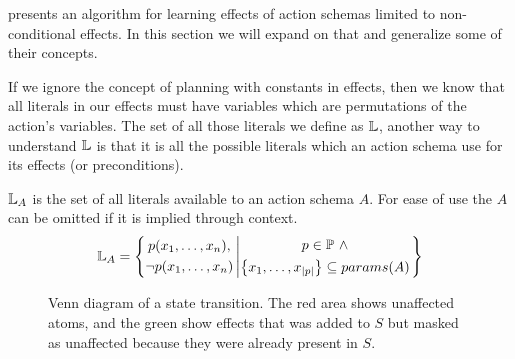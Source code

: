 \documentclass[../Master.tex]{subfiles}
\begin{document}
\cite{Walsh2008} presents an algorithm for learning effects of action schemas limited to non-conditional effects. In this section we will expand on that and generalize some of their concepts.

If we ignore the concept of planning with constants in effects, then we know that all literals in our effects must have variables which are permutations of the action's variables. The set of all those literals we define as $\mathbb{L}$, another way to understand $\mathbb{L}$ is that it is all the possible literals which an action schema use for its effects (or preconditions).

\begin{definition} 
$\mathbb{L}_A$ is the set of all literals available to an action schema $A$. For ease of use the $A$ can be omitted if it is implied through context.
	\begin{equation*}
		\mathbb{L}_A = \left\{ 
				\begin{gathered}
					p(x_1,\dots,x_n), \\
					\neg p(x_1,\dots,x_n)
				\end{gathered}
					\left|
				\begin{gathered} p \in \mathbb{P}~\land \\
                    \left\{ x_1,\dots,x_{|p|} \right\} \subseteq params(A)
				\end{gathered}				
							\right.\right\}
	\end{equation*}
\end{definition}


\begin{figure}
	\def\firstcircle{(0,0) circle (1.5cm)}
	\def\secondcircle{(0:2cm) circle (1.5cm)}
	\def\thirdcircle{(0:3.8cm) circle (2.9cm)}
	\centering
    \caption{\label{fig:nca:venn-of-effects} Venn diagram of a state transition. The red area shows unaffected atoms, and the green show effects that was added to $S$ but masked as unaffected because they were already present in $S$.}
\end{figure}
\end{document}
